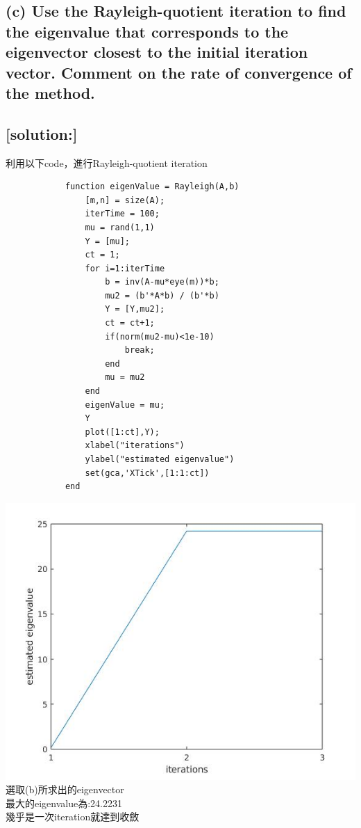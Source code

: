 \documentclass[12pt]{article}
\begin{document}
        \subsection*{(c) Use the Rayleigh-quotient iteration to find the eigenvalue that corresponds to
        the eigenvector closest to the initial iteration vector. Comment on the rate of
        convergence of the method.}
        \subsection*{[solution:]}
        利用以下code，進行Rayleigh-quotient iteration
        \begin{lstlisting}
            function eigenValue = Rayleigh(A,b)
                [m,n] = size(A);
                iterTime = 100;
                mu = rand(1,1)
                Y = [mu];
                ct = 1;
                for i=1:iterTime
                    b = inv(A-mu*eye(m))*b;
                    mu2 = (b'*A*b) / (b'*b)
                    Y = [Y,mu2];
                    ct = ct+1;
                    if(norm(mu2-mu)<1e-10)
                        break;
                    end
                    mu = mu2
                end
                eigenValue = mu;
                Y
                plot([1:ct],Y);
                xlabel("iterations")
                ylabel("estimated eigenvalue")
                set(gca,'XTick',[1:1:ct])
            end
        \end{lstlisting}
        \includegraphics[scale=0.75]{Rayleigh.jpg}\\
        選取(b)所求出的eigenvector\\
        最大的eigenvalue為:24.2231\\
        幾乎是一次iteration就達到收斂
\end{document}

